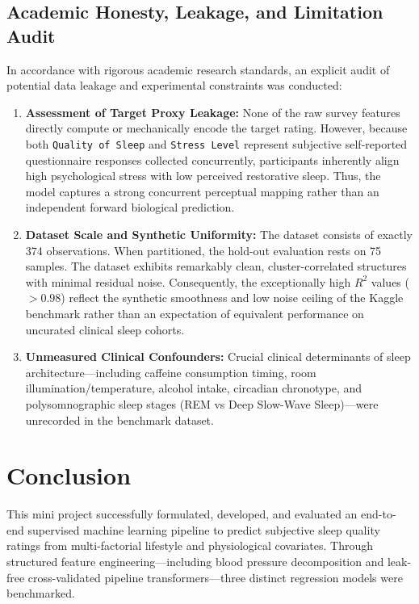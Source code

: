\documentclass[12pt,a4paper]{article}
\begin{document}
\subsection{Academic Honesty, Leakage, and Limitation Audit}
In accordance with rigorous academic research standards, an explicit audit of potential data leakage and experimental constraints was conducted:
\begin{enumerate}
    \item \textbf{Assessment of Target Proxy Leakage:} None of the raw survey features directly compute or mechanically encode the target rating. However, because both \texttt{Quality of Sleep} and \texttt{Stress Level} represent subjective self-reported questionnaire responses collected concurrently, participants inherently align high psychological stress with low perceived restorative sleep. Thus, the model captures a strong concurrent perceptual mapping rather than an independent forward biological prediction.
    \item \textbf{Dataset Scale and Synthetic Uniformity:} The dataset consists of exactly 374 observations. When partitioned, the hold-out evaluation rests on 75 samples. The dataset exhibits remarkably clean, cluster-correlated structures with minimal residual noise. Consequently, the exceptionally high $R^2$ values ($> 0.98$) reflect the synthetic smoothness and low noise ceiling of the Kaggle benchmark rather than an expectation of equivalent performance on uncurated clinical sleep cohorts.
    \item \textbf{Unmeasured Clinical Confounders:} Crucial clinical determinants of sleep architecture---including caffeine consumption timing, room illumination/temperature, alcohol intake, circadian chronotype, and polysomnographic sleep stages (REM vs Deep Slow-Wave Sleep)---were unrecorded in the benchmark dataset.
\end{enumerate}

\section{Conclusion}
This mini project successfully formulated, developed, and evaluated an end-to-end supervised machine learning pipeline to predict subjective sleep quality ratings from multi-factorial lifestyle and physiological covariates. Through structured feature engineering---including blood pressure decomposition and leak-free cross-validated pipeline transformers---three distinct regression models were benchmarked. 
\end{document}

